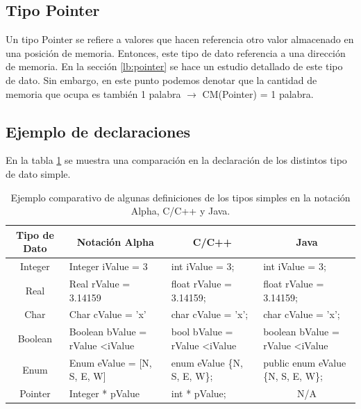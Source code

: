 \subsection{Tipo Pointer}

Un tipo Pointer se refiere a valores que hacen referencia otro valor almacenado en una posición de memoria. Entonces, este tipo de dato referencia a una dirección de memoria. En la sección \ref{lb:pointer} se hace un estudio detallado de este tipo de dato. Sin embargo, en este punto podemos denotar que la cantidad de memoria que ocupa es también 1 palabra $\rightarrow$ CM(Pointer) = 1 palabra.

\subsection{Ejemplo de declaraciones}

En la tabla \ref{tab:palabra} se muestra una comparación en la declaración de los distintos tipo de dato simple.

\begin{center}
\begin{table}[h]
\centering
\begin{tabular}{clll}
\hline
Tipo de Dato & \multicolumn{1}{c}{Notación Alpha}       & \multicolumn{1}{c}{C/C++}             & \multicolumn{1}{c}{Java}                 \\ \hline
Integer      & Integer iValue = 3                       & int iValue = 3;                       & int iValue = 3;                          \\
Real         & Real rValue = 3.14159                    & float rValue = 3.14159;               & float rValue = 3.14159;                  \\
Char         & Char cValue = 'x'                        & char cValue = 'x';                    & char cValue = 'x';                       \\
Boolean      & Boolean bValue = rValue \textless iValue & bool bValue = rValue \textless iValue & boolean bValue = rValue \textless iValue \\
Enum         & Enum eValue = {[}N, S, E, W{]}           & enum eValue \{N, S, E, W\};           & public enum eValue \{N, S, E, W\};       \\
Pointer      & Integer * pValue                         & int * pValue;                         & \multicolumn{1}{c}{N/A}                  \\ \hline
\end{tabular}
\caption{Ejemplo comparativo de algunas definiciones de los tipos simples en la notación Alpha, C/C++ y Java.}
\label{tab:palabra}
\end{table}
\end{center}

